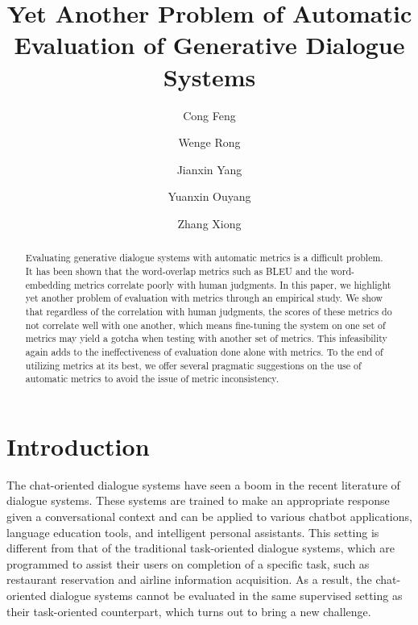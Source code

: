 \documentclass[runningheads]{llncs}
\begin{document}
    \title{Yet Another Problem of Automatic Evaluation of Generative Dialogue Systems}
    \author{Cong Feng \and Wenge Rong \and Jianxin Yang  \and Yuanxin Ouyang  \and Zhang Xiong }

    \maketitle

    \begin{abstract}
        Evaluating generative dialogue systems with automatic metrics is a difficult problem. It has been shown that the word-overlap metrics such as BLEU and the word-embedding metrics correlate poorly with human judgments. In this paper, we highlight yet another problem of evaluation with metrics through an empirical study. We show that regardless of the correlation with human judgments, the scores of these metrics do not correlate well with one another, which means fine-tuning the system on one set of metrics may yield a gotcha when testing with another set of metrics. This infeasibility again adds to the ineffectiveness of evaluation done alone with metrics. To the end of utilizing metrics at its best, we offer several pragmatic suggestions on the use of automatic metrics to avoid the issue of metric inconsistency.
    \end{abstract}

    \section{Introduction}
    The chat-oriented dialogue systems have seen a boom in the recent literature of dialogue systems. These systems are trained to make an appropriate response given a conversational context and can be applied to various chatbot applications, language education tools, and intelligent personal assistants. This setting is different from that of the traditional task-oriented dialogue systems, which are programmed to assist their users on completion of a specific task, such as restaurant reservation and airline information acquisition. As a result, the chat-oriented dialogue systems cannot be evaluated in the same supervised setting as their task-oriented counterpart, which turns out to bring a new challenge.
\end{document}
